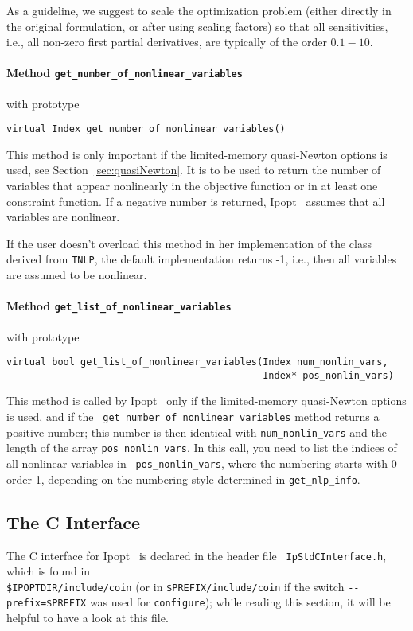\documentclass[10pt]{article}
\newcommand{\Ipopt}{{\sc Ipopt }}
\begin{document}
As a guideline, we suggest to scale the optimization problem (either
directly in the original formulation, or after using scaling factors)
so that all sensitivities, i.e., all non-zero first partial
derivatives, are typically of the order $0.1-10$.

\paragraph{Method \texttt{get\_number\_of\_nonlinear\_variables}} with prototype
\begin{verbatim}
virtual Index get_number_of_nonlinear_variables()
\end{verbatim}

This method is only important if the limited-memory quasi-Newton
options is used, see Section~\ref{sec:quasiNewton}.  It is to be used
to return the number of variables that appear nonlinearly in the
objective function or in at least one constraint function.  If a
negative number is returned, \Ipopt\ assumes that all variables are
nonlinear.

If the user doesn't overload this method in her implementation of the
class derived from {\tt TNLP}, the default implementation returns -1,
i.e., then all variables are assumed to be nonlinear.

\paragraph{Method \texttt{get\_list\_of\_nonlinear\_variables}} with prototype
\begin{verbatim}
virtual bool get_list_of_nonlinear_variables(Index num_nonlin_vars,
                                             Index* pos_nonlin_vars)
\end{verbatim}

This method is called by \Ipopt\ only if the limited-memory
quasi-Newton options is used, and if the {\tt
  get\_number\_of\_nonlinear\_variables} method returns a positive
number; this number is then identical with {\tt num\_nonlin\_vars} and
the length of the array {\tt pos\_nonlin\_vars}.  In this call, you
need to list the indices of all nonlinear variables in {\tt
  pos\_nonlin\_vars}, where the numbering starts with 0 order 1,
depending on the numbering style determined in {\tt get\_nlp\_info}.


\subsection{The C Interface}\label{sec.cinterface}
The C interface for \Ipopt\ is declared in the header file {\tt
  IpStdCInterface.h}, which is found in\\
\texttt{\$IPOPTDIR/include/coin} (or in
\texttt{\$PREFIX/include/coin} if the switch
\verb|--prefix=$PREFIX| was used for {\tt configure}); while
reading this section, it will be helpful to have a look at this file.
\end{document}
